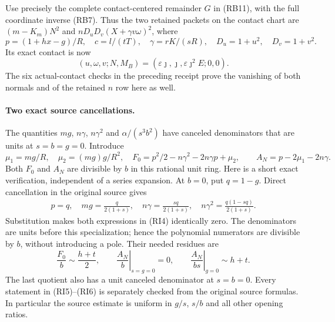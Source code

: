 Use precisely the complete contact-centered remainder $G$ in (RB11),
with the full coordinate inverse (RB7). Thus the two retained packets
on the contact chart are $(m-K_m)N^2$ and
$nD_uD_v(X+\gamma v\omega)^2$, where
\[
 p=(1+hx-g)/R,\quad c=l/(tT),\quad
 \gamma=rK/(sR),\quad D_u=1+u^2,\quad D_v=1+v^2.
\]
Its exact contact is now
\[
 (u,\omega,v;N,M_B)
   =(\varepsilon\jmath,\jmath,\varepsilon\jmath^2E;0,0).
 \tag{RI3}
\]
The six actual-contact checks in the preceding receipt prove the
vanishing of both normals and of the retained $n$ row here as well.

\paragraph{Two exact source cancellations.}
The quantities $mg$, $n\gamma$, $n\gamma^2$ and
$\alpha/(s^3b^2)$ have canceled denominators that are units at
$s=b=g=0$. Introduce
\[
 \mu_1=mg/R,\quad \mu_2=(mg)g/R^2,\quad
 F_0=p^2/2-n\gamma^2-2n\gamma p+\mu_2,\qquad
 A_N=p-2\mu_1-2n\gamma.
 \tag{RI4}
\]
Both $F_0$ and $A_N$ are divisible by $b$ in this rational unit ring.
Here is a short exact verification, independent of a series expansion.
At $b=0$, put $q=1-g$. Direct cancellation in the original source gives
\[
 \begin{gathered}
 p=q,\quad mg=\frac{q}{2(1+s)},\quad
 n\gamma=\frac{sq}{2(1+s)},\quad
 n\gamma^2=\frac{q(1-sq)}{2(1+s)}.
 \end{gathered}                                                    \tag{RI5}
\]
Substitution makes both expressions in (RI4) identically zero.
The denominators are units before this specialization; hence the
polynomial numerators are divisible by $b$, without introducing a
pole. Their needed residues are
\[
 \frac{F_0}{b}\sim\frac{h+t}{2},\qquad
 \left.\frac{A_N}{b}\right|_{s=g=0}=0,\qquad
 \left.\frac{A_N}{bs}\right|_{g=0}\sim h+t.
 \tag{RI6}
\]
The last quotient also has a unit canceled denominator at $s=b=0$.
Every statement in (RI5)--(RI6) is separately checked from the original
source formulas. In particular the source estimate is uniform in
$g/s$, $s/b$ and all other opening ratios.

